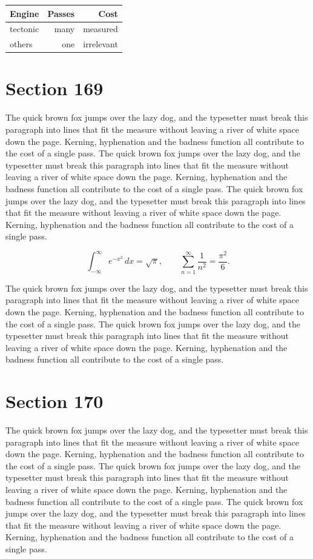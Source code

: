 \documentclass{article}
\begin{document}
\begin{center}
\begin{tabular}{lrr}
\toprule
Engine & Passes & Cost \\
\midrule
tectonic & many & measured \\
others & one & irrelevant \\
\bottomrule
\end{tabular}
\end{center}

\section{Section 169}
The quick brown fox jumps over the lazy dog, and the typesetter must break this paragraph into lines that fit the measure without leaving a river of white space down the page. Kerning, hyphenation and the badness function all contribute to the cost of a single pass. The quick brown fox jumps over the lazy dog, and the typesetter must break this paragraph into lines that fit the measure without leaving a river of white space down the page. Kerning, hyphenation and the badness function all contribute to the cost of a single pass. The quick brown fox jumps over the lazy dog, and the typesetter must break this paragraph into lines that fit the measure without leaving a river of white space down the page. Kerning, hyphenation and the badness function all contribute to the cost of a single pass. 

\begin{equation}
\int_{-\infty}^{\infty} e^{-x^{2}}\,dx = \sqrt{\pi}, \qquad
\sum_{n=1}^{\infty} \frac{1}{n^{2}} = \frac{\pi^{2}}{6}.
\end{equation}

The quick brown fox jumps over the lazy dog, and the typesetter must break this paragraph into lines that fit the measure without leaving a river of white space down the page. Kerning, hyphenation and the badness function all contribute to the cost of a single pass. The quick brown fox jumps over the lazy dog, and the typesetter must break this paragraph into lines that fit the measure without leaving a river of white space down the page. Kerning, hyphenation and the badness function all contribute to the cost of a single pass. 
\section{Section 170}
The quick brown fox jumps over the lazy dog, and the typesetter must break this paragraph into lines that fit the measure without leaving a river of white space down the page. Kerning, hyphenation and the badness function all contribute to the cost of a single pass. The quick brown fox jumps over the lazy dog, and the typesetter must break this paragraph into lines that fit the measure without leaving a river of white space down the page. Kerning, hyphenation and the badness function all contribute to the cost of a single pass. The quick brown fox jumps over the lazy dog, and the typesetter must break this paragraph into lines that fit the measure without leaving a river of white space down the page. Kerning, hyphenation and the badness function all contribute to the cost of a single pass. 
\end{document}
